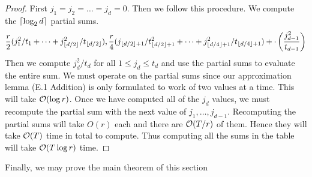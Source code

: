 \begin{proof}
    First $j_1 = j_2 = \ldots = j_d = 0$. Then we follow this procedure. We compute the $\left \lceil \log_2 d \right \rceil$ partial sums. 
    \[
        \frac{r}{2}(j_1^2/t_1 + \cdots + j^2_{\left \lfloor d/2 \right \rfloor}/{t_{\left \lfloor d/2 \right \rfloor}}), \frac{r}{4}(j_{\left \lfloor d/2 \right \rfloor+1}/t_{\left \lfloor d/2 \right \rfloor+1}^2 + \cdots + j^2_{\left \lfloor d/4 \right \rfloor+1}/{t_{\left \lfloor d/4 \right \rfloor+1}}) + \cdot \left(\frac{j_{d-1}^2}{t_{d-1}}\right)
    \]
    Then we compute $j_d^2/t_d$ for all $1 \le j_d \le t_d$ and use the partial sums to evaluate the entire sum. We must operate on the partial sums since our approximation lemma (E.1 Addition) is only formulated to work of two values at a time. This will take $\mathcal O(\log r)$.  Once we have computed all of the $j_d$ values, we must recompute the partial sum with the next value of $j_1, \ldots, j_{d-1}$. Recomputing the partial sums will take $O(r)$ each and there are $\mathcal O(T/r)$ of them. Hence they will take $\mathcal O(T)$ time in total to compute. Thus computing all the sums in the table will take $\mathcal O(T \log r)$ time. 
\end{proof}


Finally, we may prove the main theorem of this section

